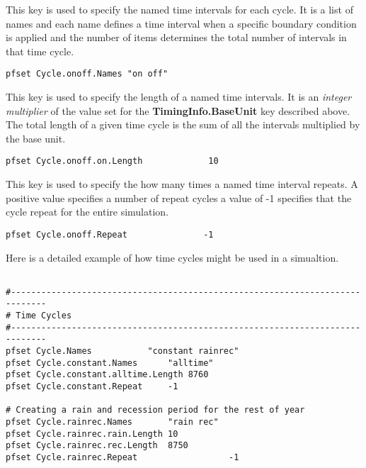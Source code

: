 {
This key is used to specify the named time intervals for each cycle.  It is a list of names and each name defines a time interval when a specific boundary condition is applied and the number of items determines the total number of intervals in that time cycle. 
}
\begin{display}\begin{verbatim}
pfset Cycle.onoff.Names "on off"
\end{verbatim}\end{display}

{
This key is used to specify the length of a named time intervals.  It is an {\em integer multiplier} of the value set for the {\bf TimingInfo.BaseUnit} key described above. The total length of a given time cycle is the sum of all the intervals multiplied by the base unit.
}
\begin{display}\begin{verbatim}
pfset Cycle.onoff.on.Length             10
\end{verbatim}\end{display}

{
This key is used to specify the how many times a named time interval repeats.  A positive value specifies a number of repeat cycles a value of -1 specifies that the cycle repeat for the entire simulation.
}
\begin{display}\begin{verbatim}
pfset Cycle.onoff.Repeat               -1
\end{verbatim}\end{display}

Here is a detailed example of how time cycles might be used in a simualtion.
\begin{display}\begin{verbatim}

#-----------------------------------------------------------------------------
# Time Cycles
#-----------------------------------------------------------------------------
pfset Cycle.Names 			"constant rainrec"
pfset Cycle.constant.Names		"alltime"
pfset Cycle.constant.alltime.Length	8760
pfset Cycle.constant.Repeat		-1

# Creating a rain and recession period for the rest of year
pfset Cycle.rainrec.Names		"rain rec"
pfset Cycle.rainrec.rain.Length	10
pfset Cycle.rainrec.rec.Length	8750
pfset Cycle.rainrec.Repeat              	-1
\end{verbatim}\end{display}



